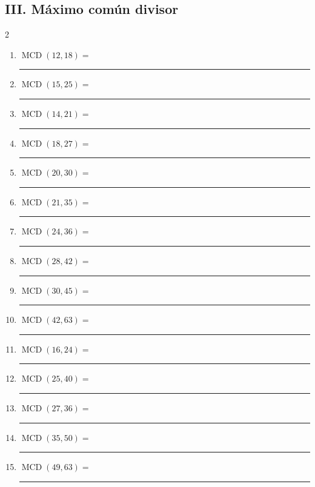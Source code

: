 \documentclass[11pt]{article}
\begin{document}
\subsection*{III. Máximo común divisor}
\begin{multicols}{2}\begin{enumerate}[leftmargin=*,start=36]
\item $\displaystyle \operatorname{MCD}(12,18)=$ \rule{2.0cm}{0.4pt}
\item $\displaystyle \operatorname{MCD}(15,25)=$ \rule{2.0cm}{0.4pt}
\item $\displaystyle \operatorname{MCD}(14,21)=$ \rule{2.0cm}{0.4pt}
\item $\displaystyle \operatorname{MCD}(18,27)=$ \rule{2.0cm}{0.4pt}
\item $\displaystyle \operatorname{MCD}(20,30)=$ \rule{2.0cm}{0.4pt}
\item $\displaystyle \operatorname{MCD}(21,35)=$ \rule{2.0cm}{0.4pt}
\item $\displaystyle \operatorname{MCD}(24,36)=$ \rule{2.0cm}{0.4pt}
\item $\displaystyle \operatorname{MCD}(28,42)=$ \rule{2.0cm}{0.4pt}
\item $\displaystyle \operatorname{MCD}(30,45)=$ \rule{2.0cm}{0.4pt}
\item $\displaystyle \operatorname{MCD}(42,63)=$ \rule{2.0cm}{0.4pt}
\item $\displaystyle \operatorname{MCD}(16,24)=$ \rule{2.0cm}{0.4pt}
\item $\displaystyle \operatorname{MCD}(25,40)=$ \rule{2.0cm}{0.4pt}
\item $\displaystyle \operatorname{MCD}(27,36)=$ \rule{2.0cm}{0.4pt}
\item $\displaystyle \operatorname{MCD}(35,50)=$ \rule{2.0cm}{0.4pt}
\item $\displaystyle \operatorname{MCD}(49,63)=$ \rule{2.0cm}{0.4pt}
\end{enumerate}\end{multicols}
\end{document}
